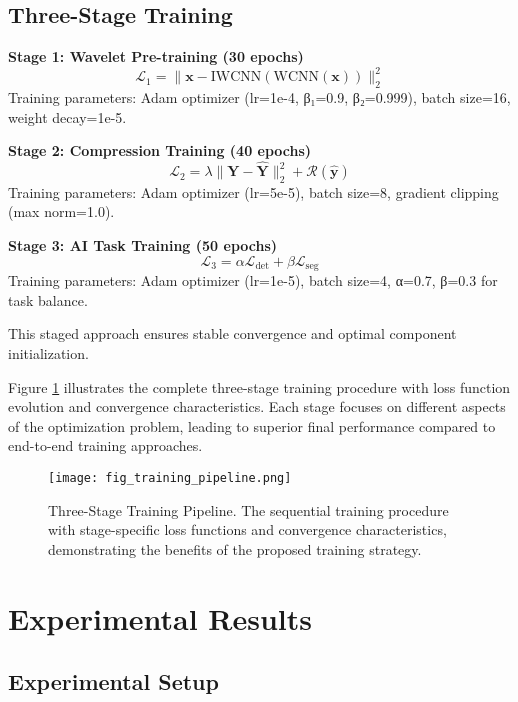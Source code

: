 \documentclass[conference]{IEEEtran}
\begin{document}
\subsection{Three-Stage Training}

\textbf{Stage 1: Wavelet Pre-training (30 epochs)}
\begin{equation}
\mathcal{L}_1 = \|\mathbf{x} - \text{IWCNN}(\text{WCNN}(\mathbf{x}))\|_2^2
\end{equation}
Training parameters: Adam optimizer (lr=1e-4, β₁=0.9, β₂=0.999), batch size=16, weight decay=1e-5.

\textbf{Stage 2: Compression Training (40 epochs)}
\begin{equation}
\mathcal{L}_2 = \lambda \|\mathbf{Y} - \hat{\mathbf{Y}}\|_2^2 + \mathcal{R}(\hat{\mathbf{y}})
\end{equation}
Training parameters: Adam optimizer (lr=5e-5), batch size=8, gradient clipping (max norm=1.0).

\textbf{Stage 3: AI Task Training (50 epochs)}
\begin{equation}
\mathcal{L}_3 = \alpha \mathcal{L}_{\text{det}} + \beta \mathcal{L}_{\text{seg}}
\end{equation}
Training parameters: Adam optimizer (lr=1e-5), batch size=4, α=0.7, β=0.3 for task balance.

This staged approach ensures stable convergence and optimal component initialization.

Figure \ref{fig:training_pipeline} illustrates the complete three-stage training procedure with loss function evolution and convergence characteristics. Each stage focuses on different aspects of the optimization problem, leading to superior final performance compared to end-to-end training approaches.

\begin{figure}[htbp]
\centering
\texttt{[image: fig\_training\_pipeline.png]}
\caption{Three-Stage Training Pipeline. The sequential training procedure with stage-specific loss functions and convergence characteristics, demonstrating the benefits of the proposed training strategy.}
\label{fig:training_pipeline}
\end{figure}

\section{Experimental Results}

\subsection{Experimental Setup}
\end{document}

